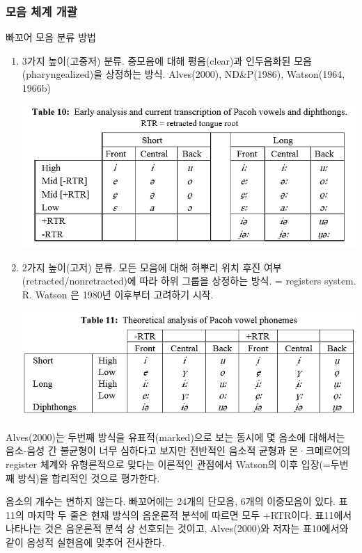 \subsubsection{모음 체계 개괄}
빠꼬어 모음 분류 방법
\begin{enumerate}
\item 3가지 높이(고중저) 분류. 중모음에 대해 평음(clear)과 인두음화된 모음(pharyngealized)을 상정하는 방식. Alves(2000), ND\&P(1986), Watson(1964, 1966b)

\includegraphics{Pacoh/src/PacohTable10.png}
\item 2가지 높이(고저) 분류. 모든 모음에 대해 혀뿌리 위치 후진 여부(retracted/nonretracted)에 따라 하위 그룹을 상정하는 방식. = registers system. R. Watson 은 1980년 이후부터 고려하기 시작.

\includegraphics{Pacoh/src/PacohTable11.png}
\end{enumerate}

Alves(2000)는 두번째 방식을 유표적(marked)으로 보는 동시에 몇 음소에 대해서는 음소-음성 간 불균형이 너무 심하다고 보지만 전반적인 음소적 균형과 몬·크메르어의 register 체계와 유형론적으로 맞다는 이론적인 관점에서 Watson의 이후 입장(=두번째 방식)을 합리적인 것으로 평가한다.

음소의 개수는 변하지 않는다. 빠꼬어에는 24개의 단모음, 6개의 이중모음이 있다. 표11의 마지막 두 줄은 현재 방식의 음운론적 분석에 따르면 모두 +RTR이다. 표11에서 나타나는 것은 음운론적 분석 상 선호되는 것이고, Alves(2000)와 저자는 표10에서와 같이 음성적 실현음에 맞추어 전사한다.


